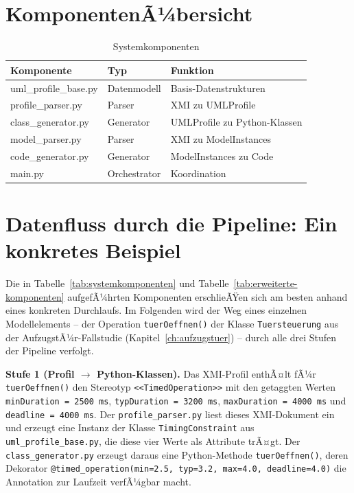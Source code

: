 ﻿\documentclass[a4paper,12pt]{report}
\theoremstyle{definition}
\begin{document}
\section{KomponentenÃ¼bersicht}

\begin{table}[h]
\centering
\begin{tabular}{@{}llp{5cm}@{}}
\toprule
\textbf{Komponente} & \textbf{Typ} & \textbf{Funktion} \\
\midrule
uml\_profile\_base.py & Datenmodell & Basis-Datenstrukturen \\
profile\_parser.py & Parser & XMI zu UMLProfile \\
class\_generator.py & Generator & UMLProfile zu Python-Klassen \\
model\_parser.py & Parser & XMI zu ModelInstances \\
code\_generator.py & Generator & ModelInstances zu Code \\
main.py & Orchestrator & Koordination \\
\bottomrule
\end{tabular}
\caption{Systemkomponenten}
\label{tab:systemkomponenten}
\label{tab:components}
\end{table}

\section{Datenfluss durch die Pipeline: Ein konkretes Beispiel}
\label{sec:datenfluss-pipeline}

Die in Tabelle~\ref{tab:systemkomponenten} und
Tabelle~\ref{tab:erweiterte-komponenten} aufgefÃ¼hrten Komponenten erschlieÃŸen
sich am besten anhand eines konkreten Durchlaufs. Im Folgenden wird der Weg
eines einzelnen Modellelements -- der Operation \texttt{tuerOeffnen()} der
Klasse \texttt{Tuersteuerung} aus der AufzugstÃ¼r-Fallstudie
(Kapitel~\ref{ch:aufzugstuer}) -- durch alle drei Stufen der Pipeline
verfolgt.

\textbf{Stufe 1 (Profil $\to$ Python-Klassen).} Das XMI-Profil enthÃ¤lt fÃ¼r
\texttt{tuerOeffnen()} den Stereotyp \texttt{<<TimedOperation>>} mit den
getaggten Werten \texttt{minDuration = 2500\,ms},
\texttt{typDuration = 3200\,ms}, \texttt{maxDuration = 4000\,ms} und
\texttt{deadline = 4000\,ms}. Der \texttt{profile\_parser.py} liest dieses
XMI-Dokument ein und erzeugt eine Instanz der Klasse
\texttt{TimingConstraint} aus \texttt{uml\_profile\_base.py}, die diese vier
Werte als Attribute trÃ¤gt. Der \texttt{class\_generator.py} erzeugt daraus
eine Python-Methode \texttt{tuerOeffnen()}, deren Dekorator
\texttt{@timed\_operation(min=2.5, typ=3.2, max=4.0, deadline=4.0)} die
Annotation zur Laufzeit verfÃ¼gbar macht.
\end{document}
